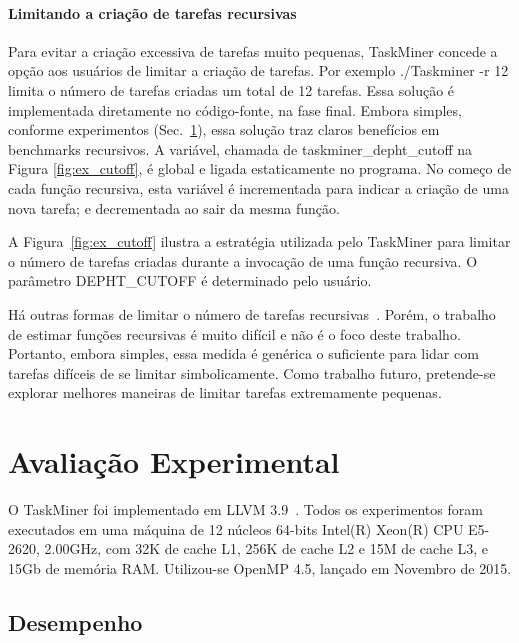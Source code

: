 \documentclass[sigplan,10pt,review]{acmart}
\newcommand\Taskminer{\mbox{\textsf{TaskMiner}}}
\begin{document}
\paragraph{Limitando a criação de tarefas recursivas}
Para evitar a criação excessiva de tarefas muito pequenas, {\Taskminer} concede a opção
aos usuários de limitar a criação de tarefas. Por exemplo \textsf{./Taskminer -r 12} limita o número
de tarefas criadas um total de 12 tarefas. Essa solução é implementada diretamente no código-fonte,
na fase final. Embora simples, conforme experimentos (Sec.~\ref{sec:eval}), essa solução traz claros
benefícios em benchmarks recursivos. A variável, chamada de \textsf{taskminer\_depht\_cutoff} na Figura
\ref{fig:ex_cutoff}, é global e ligada estaticamente no programa. No começo de cada função recursiva,
esta variável é incrementada para indicar a criação de uma nova tarefa; e decrementada ao sair da mesma função.

\begin{example}
A Figura~\ref{fig:ex_cutoff} ilustra a estratégia utilizada pelo {\Taskminer} para limitar
o número de tarefas criadas durante a invocação de uma função recursiva.
O parâmetro \textsf{DEPHT\_CUTOFF} é determinado pelo usuário.
\end{example}

Há outras formas de limitar o número de tarefas recursivas~\cite{Iwasaki16,Iwasaki16B}.
Porém, o trabalho de estimar funções recursivas é muito difícil e não é o foco deste trabalho.
Portanto, embora simples, essa medida é genérica o suficiente para lidar com tarefas difíceis de se
limitar simbolicamente. Como trabalho futuro, pretende-se explorar melhores maneiras de
limitar tarefas extremamente pequenas.

\section{Avalia\c{c}\~{a}o Experimental}
\label{sec:eval}

O {\Taskminer} foi implementado em LLVM 3.9~\cite{Lattner04}. Todos os experimentos
foram executados em uma máquina de 12 núcleos 64-bits Intel(R) Xeon(R) CPU E5-2620, 2.00GHz, com 32K de cache L1, 256K de cache L2 e 15M de cache L3, e 15Gb de memória RAM. Utilizou-se OpenMP 4.5, lançado em 
Novembro de 2015.

\subsection{Desempenho}
\label{sub:performance}
\end{document}

